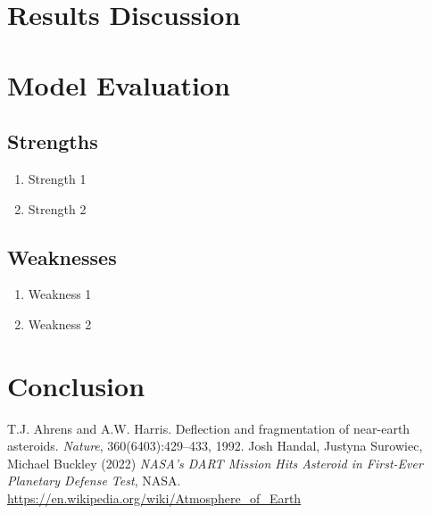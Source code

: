 \documentclass{Setup}
\begin{document}
\newpage
\lipsum[1-4] %

\section{Results Discussion}
\lipsum[1-3] %


\section{Model Evaluation}
\subsection{Strengths}
\begin{enumerate}
    \item Strength 1
    \item Strength 2
\end{enumerate}
\subsection{Weaknesses}
\begin{enumerate}
    \item Weakness 1
    \item Weakness 2
\end{enumerate}


\section{Conclusion}
\lipsum[1] %


\begin{thebibliography}{99} %
   T.J. Ahrens and A.W. Harris. Deflection and fragmentation of near-earth asteroids. \textit{Nature}, 360(6403):429–433, 1992.
   Josh Handal, Justyna Surowiec, Michael Buckley (2022) \textit{NASA’s DART Mission Hits Asteroid in First-Ever Planetary Defense Test}, NASA. 
   \url{https://en.wikipedia.org/wiki/Atmosphere_of_Earth}
\end{thebibliography}
\end{document}
